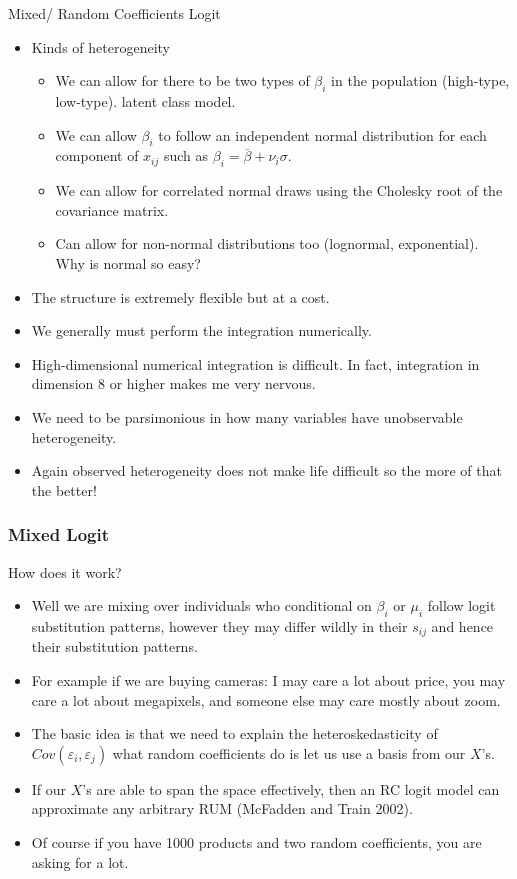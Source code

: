 \begin{frame}{Mixed/ Random Coefficients Logit}
\begin{itemize}
\item Kinds of heterogeneity
\begin{itemize}
\item We can allow for there to be two types of $\beta_i$ in the population (high-type, low-type). \alert{latent class model}.
\item We can allow $\beta_i$ to follow an independent normal distribution for each component of $x_{ij}$ such as $\beta_i = \overline{\beta} + \nu_i \sigma$.
\item We can allow for correlated normal draws using the Cholesky root of the covariance matrix.
\item Can allow for non-normal distributions too (lognormal, exponential). Why is normal so easy?
\end{itemize}
\item The structure is extremely flexible but at a cost.
\item We generally must perform the integration numerically.
\item High-dimensional numerical integration is difficult. In fact, integration in dimension 8 or higher makes me very nervous.
\item We need to be parsimonious in how many variables have unobservable heterogeneity.
\item Again observed heterogeneity does not make life difficult so the more of that the better!
\end{itemize}
\end{frame}

\begin{frame}
\frametitle{Mixed Logit}
How does it work?
 \begin{itemize}
\item Well we are mixing over individuals who conditional on $\beta_i$ or $\mu_i$ follow logit substitution patterns, however they may differ wildly in their $s_{ij}$ and hence their substitution patterns.
\item For example if we are buying cameras: I may care a lot about price, you may care a lot about megapixels, and someone else may care mostly about zoom.
\item The basic idea is that we need to explain the heteroskedasticity of $Cov(\varepsilon_i, \varepsilon_j)$ what random coefficients do is let us use a basis from our $X$'s.
\item If our $X$'s are able to span the space effectively, then an RC logit model can approximate any arbitrary RUM (McFadden and Train 2002). 
\item Of course if you have 1000 products and two random coefficients, you are asking for a lot.
 \end{itemize}
\end{frame}


